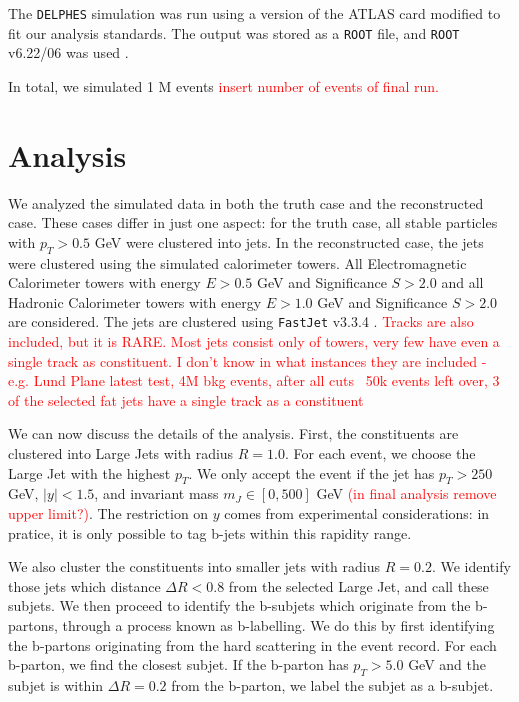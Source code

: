\documentclass[10pt,a4paper]{book}
\newcommand\todo[1]{\textcolor{red}{#1}}
\def\code#1{\texttt{#1}}
\begin{document}
The \code{DELPHES} simulation was run using a version of the ATLAS card modified to fit our analysis standards. The output was stored as a \code{ROOT} file, and \code{ROOT} v6.22/06 was used \cite{fons_rademakers_2020_3895852}. 

In total, we simulated 1 M events \todo{insert number of events of final run.}


\section{Analysis}

We analyzed the simulated data in both the truth case and the reconstructed case. These cases differ in just one aspect: for the truth case, all stable particles with $p_T > 0.5$ GeV were clustered into jets. In the reconstructed case, the jets were clustered using the simulated calorimeter towers. All Electromagnetic Calorimeter towers with energy $E > 0.5$ GeV and Significance $S > 2.0$ and all Hadronic Calorimeter towers with energy $E > 1.0$ GeV and Significance $S > 2.0$ are considered. The jets are clustered using \code{FastJet} v3.3.4 \cite{Cacciari:2011ma}.
\todo{Tracks are also included, but it is RARE. Most jets consist only of towers, very few have even a single track as constituent. I don't know in what instances they are included - e.g. Lund Plane latest test, 4M bkg events, after all cuts ~50k events left over, 3 of the selected fat jets have a single track as a constituent}

We can now discuss the details of the analysis. First, the constituents are clustered into Large Jets with radius $R=1.0$.  For  each  event,  we  choose  the  Large  Jet  with  the highest $p_T$. We only accept the event if the jet has $p_T > 250$ GeV, $\vert y \vert < 1.5$, and invariant mass $m_J \in [0,500]$ GeV \todo{(in final analysis remove upper limit?)}. The restriction on $y$ comes from experimental considerations: in pratice, it is only possible to tag b-jets within this rapidity range.

We  also  cluster  the  constituents  into  smaller  jets with radius $R = 0.2$. We identify those jets which distance $\Delta R < 0.8$ from the selected Large Jet, and call these subjets. We then proceed to identify the b-subjets which originate from the b-partons, through a process known as b-labelling. We do this by first identifying the b-partons originating from the hard scattering in the event record. For each b-parton, we find the closest subjet. If the b-parton has $p_T > 5.0$ GeV and the subjet is within $\Delta R = 0.2$ from the b-parton, we label the subjet as a b-subjet. 
\end{document}
